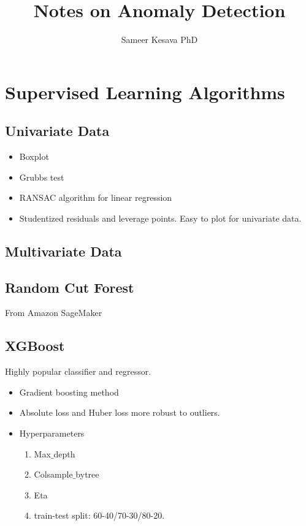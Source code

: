 \documentclass[a4paper, 12pt]{report}
\begin{document}
\title{Notes on Anomaly Detection}
\author{Sameer Kesava PhD}
\date{} %
\maketitle

\tableofcontents
\newpage



\chapter{Supervised Learning Algorithms}

\section{Univariate Data}
\begin{itemize}
\item Boxplot
\item Grubbs test
\item RANSAC algorithm for linear regression
\item Studentized residuals and leverage points. Easy to plot for univariate data.
\end{itemize}

\section{Multivariate Data}

\section{Random Cut Forest}
From Amazon SageMaker

\section{XGBoost}
Highly popular classifier and regressor. 
\begin{itemize}
\item Gradient boosting method
\item Absolute loss and Huber loss more robust to outliers.
\item Hyperparameters
\begin{enumerate}
\item Max$\_$depth
\item Colsample$\_$bytree
\item Eta
\item train-test split: 60-40/70-30/80-20.
\end{enumerate}
\end{itemize}
\end{document}
